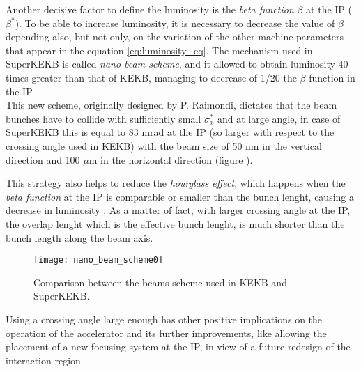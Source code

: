 Another decisive factor to define the luminosity is the \textit{beta function} $\beta$ at the IP ($\beta^{*}$). To be able to increase luminosity, it is necessary to decrease the value of $\beta$ depending also, but not only, on the variation of the other machine parameters that appear in the equation \vref{eq:luminosity_eq}.
The mechanism used in SuperKEKB is called \textit{nano-beam scheme}, and it allowed to obtain luminosity 40 times greater than that of KEKB, managing to decrease of 1/20 the $\beta$ function in the IP.\\

This new scheme, originally designed by P. Raimondi, dictates that the beam bunches have to collide with sufficiently small $\sigma_{x}^{*}$ and at large angle, in case of SuperKEKB this is equal to 83 mrad at the IP (so larger with respect to the crossing angle used in KEKB) with the beam size of 50 nm in the vertical direction and 100 $\mu$m in the horizontal direction (figure ).

This strategy also helps to reduce the \textit{hourglass effect}, which happens when the \textit{beta function} at the IP is comparable or smaller than the bunch lenght, causing a decrease in luminosity . As a matter of fact, with larger crossing angle at the IP, the overlap lenght which is the effective bunch lenght, is much shorter than the bunch length along the beam axis. \\

\begin{figure}[h!]
\centering
\texttt{[image: nano\_beam\_scheme0]}
\caption{Comparison between the beams scheme used in KEKB and SuperKEKB.}
\label{fig:beam_scheme_comparison}
\end{figure}

Using a crossing angle large enough has other positive implications on the operation of the accelerator and its further improvements, like allowing the placement of a new focusing system at the IP, in view of a future redesign of the interaction region.



